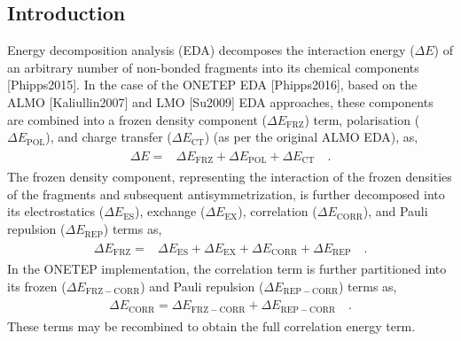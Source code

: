 \documentclass[letterpaper,10pt,english]{sphinxmanual}
\begin{document}
\subsection{Introduction}
\label{\detokenize{EDA:introduction}}
Energy decomposition analysis (EDA) decomposes the interaction energy
(\(\Delta E\)) of an arbitrary number of non-bonded fragments into
its chemical components {[}Phipps2015{]}. In the case of
the ONETEP EDA {[}Phipps2016{]}, based on the
ALMO {[}Kaliullin2007{]} and LMO {[}Su2009{]} EDA
approaches, these components are combined into a frozen density
component (\(\Delta E_\mathrm{FRZ}\)) term, polarisation
(\(\Delta E_\mathrm{POL}\)), and charge transfer
(\(\Delta E_\mathrm{CT}\)) (as per the original ALMO EDA), as,
\begin{equation*}
\begin{split}\begin{aligned}
 \Delta E =& \Delta E_\mathrm{FRZ} + \Delta E_\mathrm{POL} + \Delta E_\mathrm{CT} \quad .\end{aligned}\end{split}
\end{equation*}
The frozen density component, representing the interaction of the frozen
densities of the fragments and subsequent antisymmetrization, is further
decomposed into its electrostatics (\(\Delta E_\mathrm{ES}\)),
exchange (\(\Delta E_\mathrm{EX}\)), correlation
(\(\Delta E_\mathrm{CORR}\)), and Pauli repulsion
(\(\Delta E_\mathrm{REP}\)) terms as,
\begin{equation*}
\begin{split}\begin{aligned}
 \Delta E_\mathrm{FRZ} =& \Delta E_\mathrm{ES} + \Delta E_\mathrm{EX} + \Delta E_\mathrm{CORR} + \Delta E_\mathrm{REP} \quad .\end{aligned}\end{split}
\end{equation*}
In the ONETEP implementation, the correlation term is further
partitioned into its frozen (\(\Delta E_\mathrm{FRZ-CORR}\)) and
Pauli repulsion (\(\Delta E_\mathrm{REP-CORR}\)) terms as,
\begin{equation*}
\begin{split}\begin{aligned}
 \Delta E_\mathrm{CORR} = \Delta E_\mathrm{FRZ-CORR} + \Delta E_\mathrm{REP-CORR}
\quad .\end{aligned}\end{split}
\end{equation*}
These terms may be recombined to obtain the full correlation energy
term.
\end{document}
